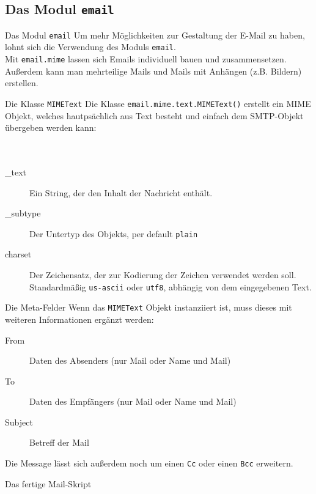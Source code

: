 \subsection{Das Modul \texttt{email}}
\begin{frame}[fragile]{Das Modul \texttt{email}}
	Um mehr Möglichkeiten zur Gestaltung der E-Mail zu haben, lohnt sich die Verwendung des Moduls \texttt{email}.\\[.5cm]
	Mit \texttt{email.mime} lassen sich Emails individuell bauen und zusammensetzen. Außerdem kann man mehrteilige Mails und Mails mit Anhängen (z.B. Bildern) erstellen.
\end{frame}

\begin{frame}[fragile]{Die Klasse \texttt{MIMEText}}
	Die Klasse \texttt{email.mime.text.MIMEText()} erstellt ein MIME Objekt, welches hautps\"achlich aus Text besteht und einfach dem SMTP-Objekt \"ubergeben werden kann: \\ \ \\
	 \ \\
	
	\begin{description}
		\item[\_text] Ein String, der den Inhalt der Nachricht enth\"alt.
		\item[\_subtype] Der Untertyp des Objekts, per default \texttt{plain}
		\item[charset] Der Zeichensatz, der zur Kodierung der Zeichen verwendet werden soll. Standardm\"a\ss{}ig \texttt{us-ascii} oder \texttt{utf8}, abh\"angig von dem eingegebenen Text.
	\end{description}
\end{frame}

\begin{frame}[fragile]{Die Meta-Felder}
	Wenn das \texttt{MIMEText} Objekt instanziiert ist, muss dieses mit weiteren Informationen erg\"anzt werden:
	
	\begin{description}
		\item[From] Daten des Absenders (nur Mail oder Name und Mail)
		\item[To] Daten des Empfängers (nur Mail oder Name und Mail)
		\item[Subject] Betreff der Mail
	\end{description}
	Die Message l\"asst sich au\ss{}erdem noch um einen \texttt{Cc} oder einen \texttt{Bcc} erweitern.
\end{frame}

\begin{frame}{Das fertige Mail-Skript}
	
\end{frame}


